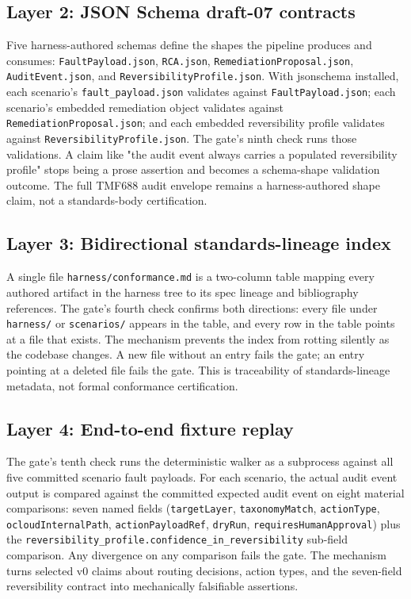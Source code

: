 \documentclass[twocolumn,10pt,a4paper]{article}
\begin{document}
\subsection{Layer 2: JSON Schema draft-07 contracts}

Five harness-authored schemas define the shapes the pipeline produces and consumes: \texttt{FaultPayload.json}, \texttt{RCA.json}, \texttt{RemediationProposal.json}, \texttt{AuditEvent.json}, and \texttt{ReversibilityProfile.json}. With jsonschema installed, each scenario's \texttt{fault\_payload.json} validates against \texttt{FaultPayload.json}; each scenario's embedded remediation object validates against \texttt{RemediationProposal.json}; and each embedded reversibility profile validates against \texttt{ReversibilityProfile.json}. The gate's ninth check runs those validations. A claim like "the audit event always carries a populated reversibility profile" stops being a prose assertion and becomes a schema-shape validation outcome. The full TMF688 audit envelope remains a harness-authored shape claim, not a standards-body certification.

\subsection{Layer 3: Bidirectional standards-lineage index}

A single file \texttt{harness/conformance.md} is a two-column table mapping every authored artifact in the harness tree to its spec lineage and bibliography references. The gate's fourth check confirms both directions: every file under \texttt{harness/} or \texttt{scenarios/} appears in the table, and every row in the table points at a file that exists. The mechanism prevents the index from rotting silently as the codebase changes. A new file without an entry fails the gate; an entry pointing at a deleted file fails the gate. This is traceability of standards-lineage metadata, not formal conformance certification.

\subsection{Layer 4: End-to-end fixture replay}

The gate's tenth check runs the deterministic walker as a subprocess against all five committed scenario fault payloads. For each scenario, the actual audit event output is compared against the committed expected audit event on eight material comparisons: seven named fields (\texttt{targetLayer}, \texttt{taxonomyMatch}, \texttt{actionType}, \texttt{ocloudInternalPath}, \texttt{actionPayloadRef}, \texttt{dryRun}, \texttt{requiresHumanApproval}) plus the \texttt{reversibility\_profile.confidence\_in\_reversibility} sub-field comparison. Any divergence on any comparison fails the gate. The mechanism turns selected v0 claims about routing decisions, action types, and the seven-field reversibility contract into mechanically falsifiable assertions.
\end{document}
